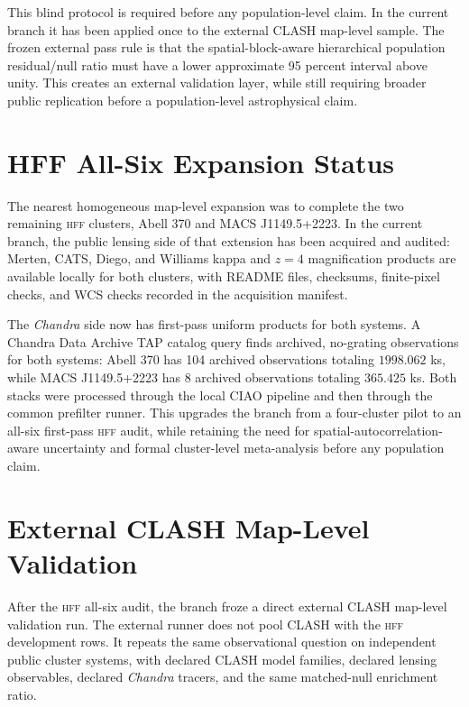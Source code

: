 \documentclass[11pt,a4paper]{article}
\newcommand{\HFF}{\textsc{hff}}
\newcommand{\Chandra}{\textit{Chandra}}
\begin{document}
This blind protocol is required before any population-level claim. In the
current branch it has been applied once to the external CLASH map-level sample.
The frozen external pass rule is that the spatial-block-aware hierarchical
population residual/null ratio must have a lower approximate 95 percent
interval above unity. This creates an external validation layer, while still
requiring broader public replication before a population-level astrophysical
claim.

\section{HFF All-Six Expansion Status}

The nearest homogeneous map-level expansion was to complete the two remaining
\HFF{} clusters, Abell 370 and MACS J1149.5+2223. In the current branch, the
public lensing side of that extension has been acquired and audited: Merten,
CATS, Diego, and Williams kappa and \(z=4\) magnification products are available
locally for both clusters, with README files, checksums, finite-pixel checks,
and WCS checks recorded in the acquisition manifest.

The \Chandra{} side now has first-pass uniform products for both systems. A
Chandra Data Archive TAP catalog query finds archived, no-grating observations
for both systems: Abell 370 has 104 archived observations totaling
\(1998.062\) ks, while MACS J1149.5+2223 has 8 archived observations totaling
\(365.425\) ks. Both stacks were processed through the local CIAO pipeline and
then through the common prefilter runner. This upgrades the branch from a
four-cluster pilot to an all-six first-pass \HFF{} audit, while retaining the
need for spatial-autocorrelation-aware uncertainty and formal cluster-level
meta-analysis before any population claim.

\section{External CLASH Map-Level Validation}

After the \HFF{} all-six audit, the branch froze a direct external CLASH
map-level validation run. The external runner does not pool CLASH with the
\HFF{} development rows. It repeats the same observational question on
independent public cluster systems, with declared CLASH model families,
declared lensing observables, declared \Chandra{} tracers, and the same
matched-null enrichment ratio.
\end{document}
